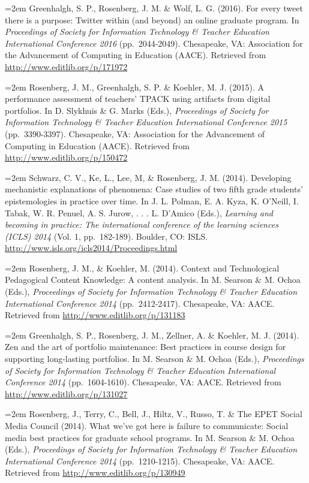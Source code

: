 \documentclass[14,]{article}
\begin{document}
\hangindent=2em Greenhalgh, S. P., Rosenberg, J. M. \& Wolf, L. G.
(2016). For every tweet there is a purpose: Twitter within (and beyond)
an online graduate program. In \emph{Proceedings of Society for
Information Technology \& Teacher Education International Conference
2016} (pp.~2044-2049). Chesapeake, VA: Association for the Advancement
of Computing in Education (AACE). Retrieved from
\url{http://www.editlib.org/p/171972}

\hangindent=2em Rosenberg, J. M., Greenhalgh, S. P. \& Koehler, M. J.
(2015). A performance assessment of teachers' TPACK using artifacts from
digital portfolios. In D. Slykhuis \& G. Marks (Eds.), \emph{Proceedings
of Society for Information Technology \& Teacher Education International
Conference 2015} (pp.~3390-3397). Chesapeake, VA: Association for the
Advancement of Computing in Education (AACE). Retrieved from
\url{http://www.editlib.org/p/150472}

\hangindent=2em Schwarz, C. V., Ke, L., Lee, M, \& Rosenberg, J. M.
(2014). Developing mechanistic explanations of phenomena: Case studies
of two fifth grade students' epistemologies in practice over time. In J.
L. Polman, E. A. Kyza, K. O'Neill, I. Tabak, W. R. Penuel, A. S. Jurow,
. . . L. D'Amico (Eds.), \emph{Learning and becoming in practice: The
international conference of the learning sciences (ICLS) 2014} (Vol. 1,
pp.~182-189). Boulder, CO: ISLS.
\url{http://www.isls.org/icls2014/Proceedings.html}

\hangindent=2em Rosenberg, J. M., \& Koehler, M. (2014). Context and
Technological Pedagogical Content Knowledge: A content analysis. In M.
Searson \& M. Ochoa (Eds.), \emph{Proceedings of Society for Information
Technology \& Teacher Education International Conference 2014}
(pp.~2412-2417). Chesapeake, VA: AACE. Retrieved from
\url{http://www.editlib.org/p/131183}

\hangindent=2em Greenhalgh, S. P., Rosenberg, J. M., Zellner, A. \&
Koehler, M. J. (2014). Zen and the art of portfolio maintenance: Best
practices in course design for supporting long-lasting portfolios. In M.
Searson \& M. Ochoa (Eds.), \emph{Proceedings of Society for Information
Technology \& Teacher Education International Conference 2014}
(pp.~1604-1610). Chesapeake, VA: AACE. Retrieved from
\url{http://www.editlib.org/p/131027}

\hangindent=2em Rosenberg, J., Terry, C., Bell, J., Hiltz, V., Russo, T.
\& The EPET Social Media Council (2014). What we've got here is failure
to communicate: Social media best practices for graduate school
programs. In M. Searson \& M. Ochoa (Eds.), \emph{Proceedings of Society
for Information Technology \& Teacher Education International Conference
2014} (pp.~1210-1215). Chesapeake, VA: AACE. Retrieved from
\url{http://www.editlib.org/p/130949}
\end{document}

